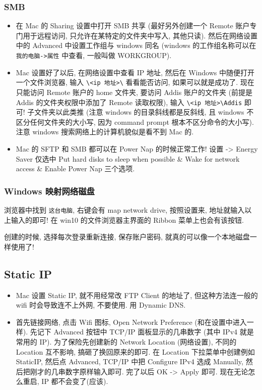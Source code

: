 \subsubsection{SMB}
\begin{itemize}
\item 在 Mac 的 Sharing 设置中打开 SMB 共享 (最好另外创建一个 Remote 账户专门用于远程访问, 只允许在某特定的文件夹中写入, 其他只读). 然后在网络设置中的 Advanced 中设置工作组与 windows 同名 (windows 的工作组名称可以在 \verb|我的电脑->属性| 中查看, 一般叫做 WORKGROUP).

\item Mac 设置好了以后, 在网络设置中查看 IP 地址, 然后在 Windows 中随便打开一个文件浏览器, 输入 \verb|\<ip 地址>\| 看看能否访问, 如果可以就是成功了. 现在只能访问 Remote 账户的 home 文件夹, 要访问 Addis 账户的文件夹 (前提是 Addis 的文件夹权限中添加了 Remote 读取权限), 输入 \verb|\<ip 地址>\Addis| 即可! 子文件夹以此类推 (注意 windows 的目录斜线都是反斜线, 且 windows 不区分任何文件夹的大小写, 因为 command prompt 根本不区分命令的大小写). 注意 windows 搜索网络上的计算机貌似是看不到 Mac 的.

\item Mac 的 SFTP 和 SMB 都可以在 Power Nap 的时候正常工作! 设置 -> Energy Saver 仅选中 Put hard disks to sleep when possible \& Wake for network access \& Enable Power Nap 三个选项.
\end{itemize}

\subsubsection{Windows 映射网络磁盘}
浏览器中找到 \verb|这台电脑|, 右键会有 map network drive, 按照设置来, 地址就输入以上输入的即可! 在 win10 的文件浏览器主界面的 Ribbon 菜单上也会有该按钮.

创建的时候, 选择每次登录重新连接, 保存账户密码, 就真的可以像一个本地磁盘一样使用了!

\subsection{Static IP}
\begin{itemize}
\item Mac 设置 Static IP, 就不用经常改 FTP Client 的地址了, 但这种方法连一般的 wifi 时会导致连不上外网, 不要使用. 用 Dynamic DNS.
\item 首先链接网络, 点击 Wifi 图标, Open Network Preference (和在设置中进入一样). 先记下 Advanced 按钮中 TCP/IP 面板显示的几串数字 (其中 IPv4 就是常用的 IP). 为了保险先创建新的 Network Location (网络设置), 不同的 Location 互不影响, 搞砸了换回原来的即可. 在 Location 下拉菜单中创建例如 StaticIP, 然后点 Advanced, TCP/IP 中把 Configure IPv4 选成 Manually, 然后把刚才的几串数字原样输入即可. 完了以后 OK -> Apply 即可. 现在无论怎么重启, IP 都不会变了(应该).
\end{itemize}

